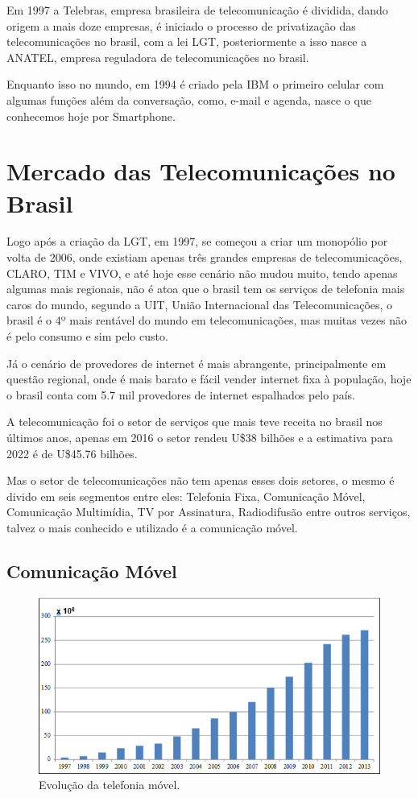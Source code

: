\documentclass{sbrt2018port}
\begin{document}
Em 1997 a Telebras, empresa brasileira de telecomunicação é dividida, dando origem a mais doze empresas, é iniciado o processo de privatização das telecomunicações no brasil, com a lei LGT, posteriormente a isso nasce a ANATEL, empresa reguladora de telecomunicações no brasil.

Enquanto isso no mundo, em 1994 é criado pela IBM o primeiro celular com algumas funções além da conversação, como, e-mail e agenda, nasce o que conhecemos hoje por Smartphone.

\section{Mercado das Telecomunicações no Brasil}
\label{s_mercadoBrasil}
Logo após a criação da LGT, em 1997, se começou a criar um monopólio por volta de 2006, onde existiam apenas três grandes empresas de telecomunicações, CLARO, TIM e VIVO, e até hoje esse cenário não mudou muito, tendo apenas algumas mais regionais, não é atoa que o brasil tem os serviços de telefonia mais caros do mundo, segundo a UIT, União Internacional das Telecomunicações, o brasil é o 4º mais rentável do mundo em telecomunicações, mas muitas vezes não é pelo consumo e sim pelo custo.

Já o cenário de provedores de internet é mais abrangente, principalmente em questão regional, onde é mais barato e fácil vender internet fixa à população, hoje o brasil conta com 5.7 mil provedores de internet espalhados pelo país.

A telecomunicação foi o setor de serviços que mais teve receita no brasil nos últimos anos, apenas em 2016 o setor rendeu U\$38 bilhões e a estimativa para 2022 é de U\$45.76 bilhões.

Mas o setor de telecomunicações não tem apenas esses dois setores, o mesmo é divido em seis segmentos entre eles: Telefonia Fixa, Comunicação Móvel, Comunicação Multimídia, TV por Assinatura, Radiodifusão entre outros serviços, talvez o mais conhecido e utilizado é a comunicação móvel.

\subsection{Comunicação Móvel}
\label{s_segmento}

\begin{figure}[!ht]%
    \centering
    \includegraphics[width=\linewidth]{grafico.png}
    \caption{Evolução da telefonia móvel.}
    \label{f_cerd2}
\end{figure}
\end{document}
